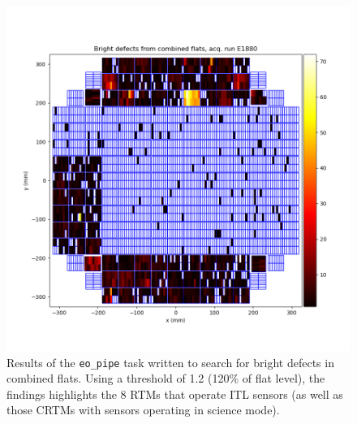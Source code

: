\begin{figure}[ht]
    \centering
    \includegraphics[width=0.75\linewidth]{figures/vamp_desc/vampire_defects_fp_plot_LSSTCam_u_jchiang_eo_vampire_defects_E1880_w_2024_35_20241111T173034Z.png}
    \caption{Results of the {\tt eo\_pipe} task written to search for bright defects in combined flats. Using a threshold of 1.2 (120\% of flat level), the findings highlights the 8 RTMs that operate ITL sensors (as well as those CRTMs with sensors operating in science mode).}
    \label{fig:eopipe_brightdefects_task_result}
\end{figure}

%
%
%

